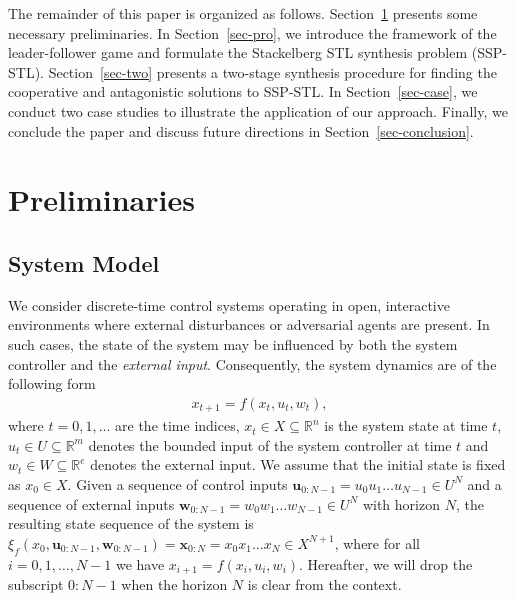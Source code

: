 \documentclass[letterpaper, 10 pt, conference]{ieeeconf}
\begin{document}
 

The remainder of this paper is organized as follows. Section~\ref{sec-pre} presents some necessary preliminaries. 
In Section~\ref{sec-pro}, we introduce the 
framework of the leader-follower game  and formulate the Stackelberg STL synthesis problem (SSP-STL). 
Section~\ref{sec-two} presents a two-stage synthesis procedure for finding the cooperative and antagonistic solutions to SSP-STL.
In Section~\ref{sec-case}, we conduct two case studies to illustrate the application of our approach. Finally, we conclude the paper and discuss future directions in Section~\ref{sec-conclusion}.

\section{Preliminaries}\label{sec-pre}
\subsection{System Model}
We consider  discrete-time control systems operating in open, interactive environments where external disturbances or adversarial agents are present. In such cases, the state of the system may be influenced by both the system controller and the \emph{external input}. Consequently, the system dynamics are of the following form
\begin{align}\label{sys-dis}
    x_{t+1}=f(x_t,u_t,w_t), 
\end{align}
where 
$t=0,1,\dots$ are the time indices, 
$x_t\in X \subseteq \mathbb{R}^n$ is the system state at time $t$, $u_t\in U\subseteq  \mathbb{R}^m$ denotes the bounded input of the system controller at time $t$
and $w_t\in W \subseteq \mathbb{R}^e$ denotes the external input. 
We assume that the initial state is fixed as $x_0\in X$. 
Given a sequence of control inputs 
$\mathbf{u}_{0:N-1}=u_0 u_{1}\dots u_{N-1}\in U^{N}$ and a sequence of external inputs $\mathbf{w}_{0:N-1}=w_0 w_{1}\dots w_{N-1}\in U^{N}$ with horizon $N$, 
the resulting state sequence of the system is $\xi_f(x_0,\mathbf{u}_{0:N-1},\mathbf{w}_{0:N-1})=\mathbf{x}_{0:N}=x_0 x_1\dots x_N\in X^{N+1}$, where for all $ i=0,1,\dots,N-1$ we have $x_{i+1}=f(x_i,u_i,w_i)$. 
Hereafter, we will drop the subscript $0:N-1$ when the horizon $N$ is clear from the context.
\end{document}
